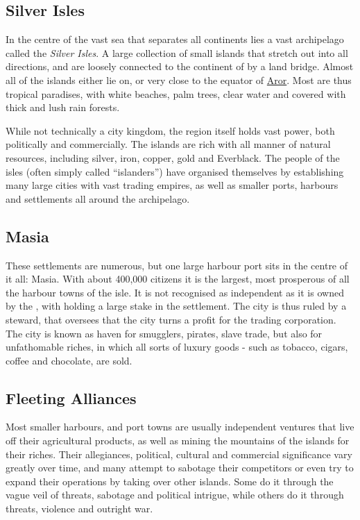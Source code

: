 \subsection{Silver Isles}
\label{sec:Silver Isles}

In the centre of the vast sea that separates all continents lies a vast
archipelago called the \emph{Silver Isles}. A large collection of small
islands that stretch out into all directions, and are loosely connected to the
continent of  by a land bridge. Almost all of the islands
either lie on, or very close to the equator of \hyperref[sec:Aror]{Aror}. Most
are thus tropical paradises, with white beaches, palm trees, clear water and
covered with thick and lush rain forests.

While not technically a city kingdom, the region itself holds vast power,
both politically and commercially. The islands are rich with all manner of
natural resources, including silver, iron, copper, gold and Everblack. The
people of the isles (often simply called ``islanders'') have organised
themselves by establishing many large cities with vast trading empires,
as well as smaller ports, harbours and settlements all around the archipelago.

\subsection{Masia}
\label{sec:Masia}

These settlements are numerous, but one large harbour port sits in the centre
of it all: Masia. With about 400,000 citizens it is the largest, most
prosperous of all the harbour towns of the isle. It is not recognised as
independent as it is owned by the ,
with  holding a large stake in the settlement. The
city is thus ruled by a steward, that oversees that the city turns a profit
for the trading corporation. The city is known as haven for smugglers, pirates,
slave trade, but also for unfathomable riches, in which all sorts of luxury
goods - such as tobacco, cigars, coffee and chocolate, are sold.

\subsection{Fleeting Alliances}

Most smaller harbours, and port towns are usually independent ventures that
live off their agricultural products, as well as mining the mountains of
the islands for their riches. Their allegiances, political, cultural and
commercial significance vary greatly over time, and many attempt to sabotage
their competitors or even try to expand their operations by taking over other
islands. Some do it through the vague veil of threats, sabotage and political
intrigue, while others do it through threats, violence and outright war.

